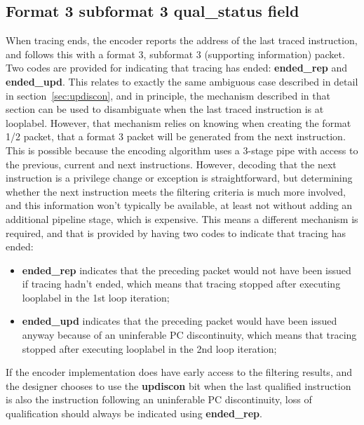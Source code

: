 \subsection{Format 3 subformat 3 \textbf{qual\_status} field} \label{sec:qual-status}

When tracing ends, the encoder reports the address of the last traced instruction, and follows this with a format 3, 
subformat 3 (supporting information) packet.  Two codes are provided for indicating that tracing has ended: 
\textbf{ended\_rep} and \textbf{ended\_upd}.  This relates to exactly the same ambiguous case described in detail in 
section~\ref{sec:updiscon}, and in principle, the mechanism described in that section can be used to disambiguate when the last traced
instruction is at looplabel.  However, that mechanism relies on knowing when creating the format 1/2 packet, that 
a format 3 packet will be generated from the next instruction.  This is possible because the encoding algorithm uses 
a 3-stage pipe with access to the previous, current and next instructions.  However, decoding that the next instruction
is a privilege change or exception is straightforward, but determining whether the next instruction meets the filtering
criteria is much more involved, and this information won't typically be available, at least not without adding an
additional pipeline stage, which is expensive.  This means a different mechanism is required, and that is provided
by having two codes to indicate that tracing has ended:

\begin{itemize}
  \item \textbf{ended\_rep} indicates that the preceding packet would not have been issued if tracing hadn't ended, 
    which means that tracing stopped after executing looplabel in the 1st loop iteration;
  \item \textbf{ended\_upd} indicates that the preceding packet would have been issued anyway because of an uninferable
    PC discontinuity, which means that tracing stopped after executing looplabel in the 2nd loop iteration;
\end{itemize}

If the encoder implementation does have early access to the filtering results, and the designer chooses to use the
\textbf{updiscon} bit when the last qualified instruction is also the instruction following an uninferable PC discontinuity,
loss of qualification should always be indicated using \textbf{ended\_rep}.

\FloatBarrier
